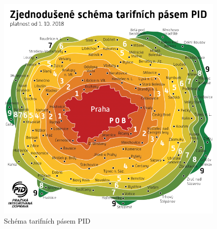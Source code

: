 \begin{figure}[H] \centering
    \includegraphics[width=400pt]{./pictures/pasma-schema.png}
    \caption[Schéma tarifních pásem PID]{Schéma tarifních pásem PID \cite{pid}}
	\label{fig:pasma-schema}                                
\end{figure}
